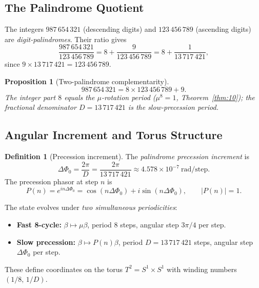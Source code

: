 \documentclass[12pt,a4paper]{article}
\theoremstyle{plain}
\newtheorem{proposition}[theorem]{Proposition}
\theoremstyle{definition}
\newtheorem{definition}[theorem]{Definition}
\theoremstyle{remark}
\newcommand{\abs}[1]{\lvert #1 \rvert}
\begin{document}
\subsection{The Palindrome Quotient}

The integers $987\,654\,321$ (descending digits) and $123\,456\,789$
(ascending digits) are \emph{digit-palindromes}.  Their ratio gives
\begin{equation}
  \frac{987\,654\,321}{123\,456\,789}
  = 8 + \frac{9}{123\,456\,789}
  = 8 + \frac{1}{13\,717\,421},
  \label{eq:palindrome-quotient}
\end{equation}
since $9 \times 13\,717\,421 = 123\,456\,789$.

\begin{proposition}[Two-palindrome complementarity]\label{prop:palindrome-comp}
  \begin{equation}
    987\,654\,321 = 8 \times 123\,456\,789 + 9.
    \label{eq:palindrome-comp}
  \end{equation}
  The integer part $8$ equals the $\mu$-rotation period ($\mu^8=1$, Theorem~\ref{thm:10});
  the fractional denominator $D = 13\,717\,421$ is the \emph{slow-precession period}.
\end{proposition}

\subsection{Angular Increment and Torus Structure}

\begin{definition}[Precession increment]\label{def:precession}
  The \emph{palindrome precession increment} is
  \begin{equation}
    \Delta\Phi_0 = \frac{2\pi}{D} = \frac{2\pi}{13\,717\,421}
                \approx 4.578\times10^{-7}\ \mathrm{rad/step}.
    \label{eq:delta-phi}
  \end{equation}
  The precession phasor at step $n$ is
  \begin{equation}
    P(n) = e^{in\Delta\Phi_0} = \cos(n\Delta\Phi_0) + i\sin(n\Delta\Phi_0),
           \qquad \abs{P(n)} = 1.
    \label{eq:phasor}
  \end{equation}
\end{definition}

The state evolves under \emph{two simultaneous periodicities}:
\begin{itemize}
  \item \textbf{Fast 8-cycle:} $\beta \mapsto \mu\beta$, period 8 steps,
    angular step $3\pi/4$ per step.
  \item \textbf{Slow precession:} $\beta \mapsto P(n)\beta$, period
    $D = 13\,717\,421$ steps, angular step $\Delta\Phi_0$ per step.
\end{itemize}
These define coordinates on the torus $T^2 = S^1 \times S^1$ with winding
numbers $(1/8,\, 1/D)$.
\end{document}
